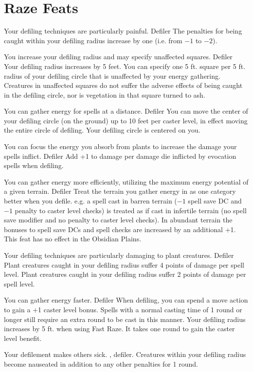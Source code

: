 \section{Raze Feats}

{Your defiling techniques are particularly painful.}
{Defiler}
{The penalties for being caught within your defiling radius increase by one (i.e. from $-1$ to $-2$).}
{}{}

{You increase your defiling radius and may specify unaffected squares.}
{Defiler}
{Your defiling radius increases by 5 feet. You can specify one 5 ft. square per 5 ft. radius of your defiling circle that is unaffected by your energy gathering. Creatures in unaffected squares do not suffer the adverse effects of being caught in the defiling circle, nor is vegetation in that square turned to ash.}
{}{}

{You can gather energy for spells at a distance.}
{Defiler}
{You can move the center of your defiling circle (on the ground) up to 10 feet per caster level, in effect moving the entire circle of defiling.}
{Your defiling circle is centered on you.}
{}

{You can focus the energy you absorb from plants to increase the damage your spells inflict.}
{Defiler}
{Add +1 to damage per damage die inflicted by evocation spells when defiling.}
{}{}

{You can gather energy more efficiently, utilizing the maximum energy potential of a given terrain.}
{Defiler}
{Treat the terrain you gather energy in as one category better when you defile. e.g. a spell cast in barren terrain ($-1$ spell save DC and $-1$ penalty to caster level checks) is treated as if cast in infertile terrain (no spell save modifier and no penalty to caster level checks). In abundant terrain the bonuses to spell save DCs and spell checks are increased by an additional +1. This feat has no effect in the Obsidian Plains.}
{}{}

{Your defiling techniques are particularly damaging to plant creatures.}
{Defiler}
{Plant creatures caught in your defiling radius suffer 4 points of damage per spell level.}
{Plant creatures caught in your defiling radius suffer 2 points of damage per spell level.}
{}

{You can gather energy faster.}
{Defiler}
{When defiling, you can spend a move action to gain a +1 caster level bonus. Spells with a normal casting time of 1 round or longer still require an extra round to be cast in this manner. Your defiling radius increases by 5 ft. when using Fast Raze.}
{It takes one round to gain the caster level benefit.}
{}

{Your defilement makes others sick.}
{, defiler.}
{Creatures within your defiling radius become nauseated in addition to any other penalties for 1 round.}
{}{}